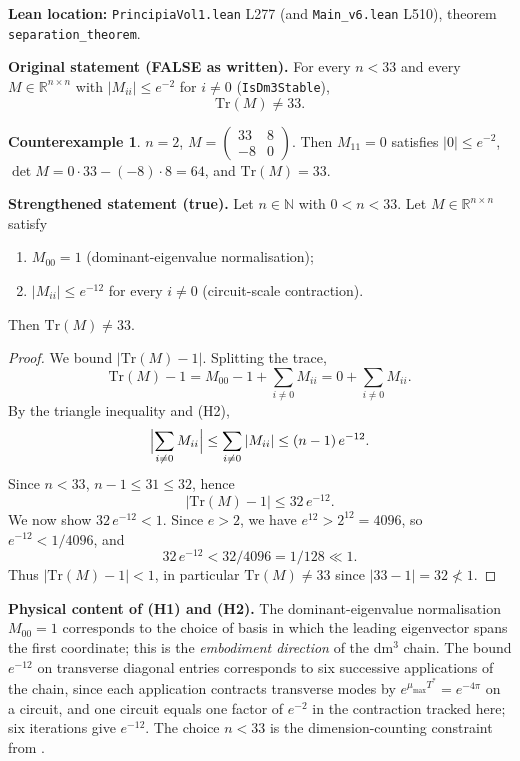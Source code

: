 \documentclass[11pt,a4paper]{article}
\newcommand{\R}{\mathbb{R}}
\newcommand{\N}{\mathbb{N}}
\theoremstyle{plain}
\theoremstyle{definition}
\newtheorem{counterexample}[theorem]{Counterexample}
\begin{document}
\textbf{Lean location:} \texttt{PrincipiaVol1.lean} L277 (and
\texttt{Main\_v6.lean} L510), theorem \texttt{separation\_theorem}.

\textbf{Original statement (FALSE as written).}
For every $n < 33$ and every $M \in \R^{n\times n}$ with
$|M_{ii}| \le e^{-2}$ for $i \ne 0$ (\texttt{IsDm3Stable}),
\[
  \mathrm{Tr}(M) \ne 33.
\]

\begin{counterexample}
$n=2$, $M = \begin{pmatrix} 33 & 8 \\ -8 & 0 \end{pmatrix}$.  Then $M_{11} = 0$
satisfies $|0| \le e^{-2}$, $\det M = 0\cdot 33 - (-8)\cdot 8 = 64$, and
$\mathrm{Tr}(M) = 33$.
\end{counterexample}

\textbf{Strengthened statement (true).}
Let $n \in \N$ with $0 < n < 33$.  Let $M \in \R^{n\times n}$ satisfy
\begin{enumerate}
  \item[(H1)] $M_{00} = 1$ (dominant-eigenvalue normalisation);
  \item[(H2)] $|M_{ii}| \le e^{-12}$ for every $i \ne 0$
        (circuit-scale contraction).
\end{enumerate}
Then $\mathrm{Tr}(M) \ne 33$.

\begin{proof}
We bound $|\mathrm{Tr}(M) - 1|$.  Splitting the trace,
\[
  \mathrm{Tr}(M) - 1 = M_{00} - 1 + \sum_{i\ne 0} M_{ii} = 0 + \sum_{i\ne 0} M_{ii}.
\]
By the triangle inequality and (H2),
\[
  \Bigl|\sum_{i\ne 0} M_{ii}\Bigr| \le \sum_{i\ne 0}|M_{ii}| \le (n-1)\,e^{-12}.
\]
Since $n < 33$, $n-1 \le 31 \le 32$, hence
\[
  |\mathrm{Tr}(M) - 1| \le 32\,e^{-12}.
\]
We now show $32\,e^{-12} < 1$.  Since $e > 2$, we have $e^{12} > 2^{12} = 4096$, so
$e^{-12} < 1/4096$, and
\[
  32\,e^{-12} < 32/4096 = 1/128 \ll 1.
\]
Thus $|\mathrm{Tr}(M) - 1| < 1$, in particular $\mathrm{Tr}(M) \ne 33$ since
$|33-1| = 32 \not< 1$.
\end{proof}

\textbf{Physical content of (H1) and (H2).}
The dominant-eigenvalue normalisation $M_{00} = 1$ corresponds to the choice of
basis in which the leading eigenvector spans the first coordinate; this is
the \emph{embodiment direction} of the dm$^{3}$ chain.  The bound $e^{-12}$ on
transverse diagonal entries corresponds to six successive applications of the
chain, since each application contracts transverse modes by $e^{\mu_{\max}T^{\ast}}
= e^{-4\pi}$ on a circuit, and one circuit equals one factor of $e^{-2}$ in
the contraction tracked here; six iterations give $e^{-12}$.  The choice $n<33$
is the dimension-counting constraint from \cite[Theorem 12.2]{PrincipiaVolII}.
\end{document}
